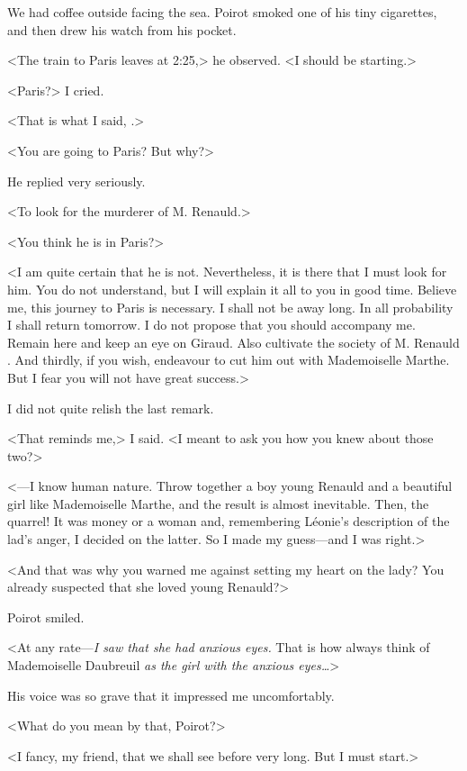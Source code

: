  We had coffee outside facing the sea. Poirot smoked one of his tiny cigarettes, and then drew his watch from his pocket. 

 <The train to Paris leaves at 2:25,> he observed. <I should be starting.> 

 <Paris?> I cried. 

 <That is what I said, .> 

 <You are going to Paris? But why?> 

 He replied very seriously. 

 <To look for the murderer of M. Renauld.> 

 <You think he is in Paris?> 

 <I am quite certain that he is not. Nevertheless, it is there that I must look for him. You do not understand, but I will explain it all to you in good time. Believe me, this journey to Paris is necessary. I shall not be away long. In all probability I shall return tomorrow. I do not propose that you should accompany me. Remain here and keep an eye on Giraud. Also cultivate the society of M. Renauld . And thirdly, if you wish, endeavour to cut him out with Mademoiselle Marthe. But I fear you will not have great success.> 

 I did not quite relish the last remark. 

 <That reminds me,> I said. <I meant to ask you how you knew about those two?> 

 <—I know human nature. Throw together a boy young Renauld and a beautiful girl like Mademoiselle Marthe, and the result is almost inevitable. Then, the quarrel! It was money or a woman and, remembering Léonie's description of the lad's anger, I decided on the latter. So I made my guess—and I was right.> 

 <And that was why you warned me against setting my heart on the lady? You already suspected that she loved young Renauld?> 

 Poirot smiled. 

 <At any rate—\emph{I saw that she had anxious eyes.} That is how always think of Mademoiselle Daubreuil \emph{as the girl with the anxious eyes\dots}> 

 His voice was so grave that it impressed me uncomfortably. 

 <What do you mean by that, Poirot?> 

 <I fancy, my friend, that we shall see before very long. But I must start.> 

